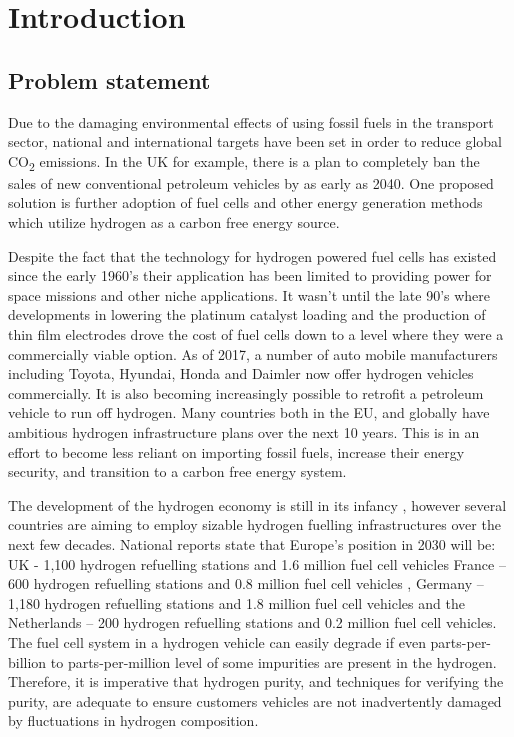 \chapter{Introduction}
\section{Problem statement}
Due to the damaging environmental effects of using fossil fuels in the transport sector, national and 
international targets have been set in order to reduce global CO\textsubscript{2} emissions.
In the UK for example, there is a plan to completely ban the sales of new conventional petroleum vehicles 
by as early as 2040. 
\cite{DepartmentforEnvironment2017} 
One proposed solution is further adoption of fuel cells and other energy generation methods which utilize
hydrogen as a carbon free energy source. 

Despite the fact that the technology for hydrogen powered fuel cells has existed since the early 1960’s their application has been limited to providing 
power for space missions and other niche applications. It wasn’t until the late 90’s where developments 
in lowering the platinum catalyst loading and the production of thin film electrodes drove the cost of fuel 
cells down to a level where they were a commercially viable option. As of 2017, a number of auto 
mobile manufacturers including Toyota,\cite{Toyota2015} Hyundai, \cite{Hyundai2015} Honda \cite{Honda} 
and Daimler \cite{Mohrdieck2014} now offer hydrogen vehicles commercially. It is also becoming 
increasingly possible to retrofit a petroleum vehicle to run off hydrogen.\cite{FCell2016} 
Many countries both in the EU, and globally have ambitious hydrogen infrastructure plans over the next 
10 years. This is in an effort to become less reliant on importing fossil fuels, increase their energy security,
and transition to a carbon free energy system.

The development of the hydrogen economy is still in its infancy ,  however several 
countries are aiming to employ sizable hydrogen fuelling infrastructures over the next few decades. 
National reports state that Europe’s position in 2030 will be: UK - 1,100 hydrogen refuelling stations
and 1.6 million fuel cell vehicles \cite{UKH2Mobility2013} France – 600 hydrogen refuelling stations 
and 0.8 million fuel cell vehicles \cite{Summerton2015}, Germany – 1,180 hydrogen refuelling stations 
\cite{Hayter2014} 
and 1.8 million fuel cell vehicles  and the Netherlands – 200 hydrogen refuelling stations and 0.2 
million fuel cell
vehicles. \cite{Hayter2014} The fuel cell system in a hydrogen vehicle can easily degrade if even 
parts-per-billion to parts-per-million level of some impurities are present in the hydrogen. 
Therefore, it is imperative that hydrogen purity, and techniques for verifying the purity, 
are adequate to ensure customers vehicles are not inadvertently damaged by fluctuations in hydrogen 
composition. 

